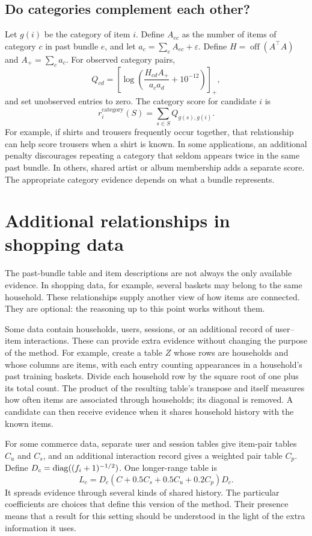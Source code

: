 \documentclass[11pt,a4paper]{article}
\numberwithin{equation}{section}
\begin{document}
\subsection{Do categories complement each other?}
Let $g(i)$ be the category of item $i$. Define $A_{ec}$ as the number of items of category
$c$ in past bundle $e$, and let $a_c=\sum_e A_{ec}+\varepsilon$. Define
$H=\operatorname{off}(A^\top A)$ and $A_+=\sum_c a_c$. For observed category pairs,
\begin{equation}
 Q_{cd}=\left[\log\left(\frac{H_{cd}A_+}{a_c a_d}+10^{-12}\right)\right]_+,
\end{equation}
and set unobserved entries to zero. The category score for candidate $i$ is
\begin{equation}
 r_i^{\mathrm{category}}(S)=\sum_{s\in S}Q_{g(s),g(i)}.
\end{equation}
For example, if shirts and trousers frequently occur together, that relationship can help
score trousers when a shirt is known. In some applications, an additional penalty discourages
repeating a category that seldom appears twice in the same past bundle. In others, shared
artist or album membership adds a separate score. The appropriate category evidence
depends on what a bundle represents.

\section{Additional relationships in shopping data}\label{context}
The past-bundle table and item descriptions are not always the only available evidence.
In shopping data, for example, several baskets may belong to the same household. These
relationships supply another view of how items are connected. They are optional: the
reasoning up to this point works without them.

Some data contain households, users, sessions, or an additional record of user--item
interactions. These can provide extra evidence without changing the purpose of the method.
For example, create a table $Z$ whose rows are households and whose columns are items,
with each entry counting appearances in a household's past training baskets. Divide each
household row by the square root of one plus its total count. The product of the resulting
table's transpose and itself measures how often items are associated through households;
its diagonal is removed. A candidate can then receive evidence when it shares household
history with the known items.

For some commerce data, separate user and session tables give item-pair tables $C_u$ and
$C_s$, and an additional interaction record gives a weighted pair table $C_p$. Define
$D_c=\operatorname{diag}((f_i+1)^{-1/2})$. One longer-range table is
\begin{equation}
 L_c=D_c(C+0.5C_s+0.5C_u+0.2C_p)D_c.
\end{equation}
It spreads evidence through several kinds of shared history. The particular coefficients
are choices that define this version of the method. Their presence means that a result for
this setting should be understood in the light of the extra information it uses.
\end{document}
